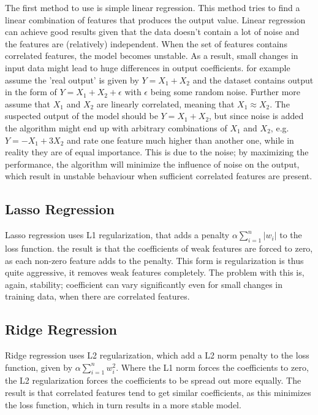 The first method to use is simple linear regression. This method tries to find a linear combination of features that produces the output value. Linear regression can achieve good results given that the data doesn't contain a lot of noise and the features are (relatively) independent. When the set of features contains correlated features, the model becomes unstable. As a result, small changes in input data might lead to huge differences in output coefficients. for example assume the 'real output' is given by $Y = X_1 + X_2$ and the dataset contains output in the form of $Y = X_1 + X_2 + \epsilon$ with $\epsilon$ being some random noise. Further more assume that $X_1$ and $X_2$ are linearly correlated, meaning that $X_1 \approx X_2$. The suspected output of the model should be $Y = X_1 + X_2$, but since noise is added the algorithm might end up with arbitrary combinations of $X_1$ and $X_2$, e.g. $Y = -X_1 + 3X_2$ and rate one feature much higher than another one, while in reality they are of equal importance. This is due to the noise; by maximizing the performance, the algorithm will minimize the influence of noise on the output, which result in unstable behaviour when sufficient correlated features are present. 

\clearpage

\subsection{Lasso Regression}
Lasso regression uses L1 regularization, that adds a penalty $\alpha\sum\limits_{i=1}^{n} |w_i|$ to the loss function. the result is that the coefficients of weak features are forced to zero, as each non-zero feature adds to the penalty. This form is regularization is thus quite aggressive, it removes weak features completely. The problem with this is, again, stability; coefficient can vary significantly even for small changes in training data, when there are correlated features.

\subsection{Ridge Regression}
Ridge regression uses L2 regularization, which add a L2 norm penalty to the loss function, given by $\alpha\sum\limits_{i=1}^{n} w_i^2$. Where the L1 norm forces the coefficients to zero, the L2 regularization forces the coefficients to be spread out more equally. The result is that correlated features tend to get similar coefficients, as this minimizes the loss function, which in turn results in a more stable model. 

